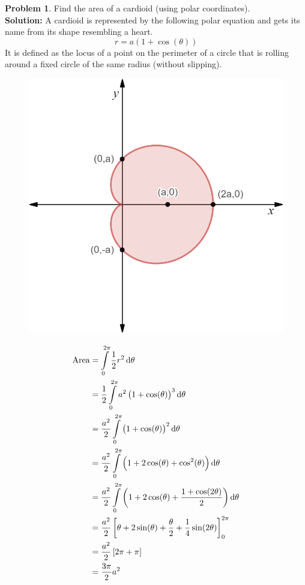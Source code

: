 \documentclass[14]{article}
\theoremstyle{definition}
\newtheorem{prob}{Problem}
\theoremstyle{case}
\begin{document}
\begin{prob}
Find the area of a cardioid (using polar coordinates).\\
\textbf{Solution:} A cardioid is represented by the following polar equation and gets its name from its shape resembling a heart. \[r = a\left(1 + \cos(\theta)\right)\]
It is defined as the locus of a point on the perimeter of a circle that is rolling around a fixed circle of the same radius (without slipping).
\begin{figure}[h]\centering
\includegraphics[scale=.3]{images/cardioid}
\end{figure}
\begin{align*}
\text{Area} &= \int\limits_0^{2\pi} \dfrac12 r^2 \dif \theta\\
&= \dfrac12 \int\limits_0^{2\pi} a^2\left(1+\cos(\theta)\right)^3 \dif \theta\\
&= \dfrac{a^2}2 \int\limits_0^{2\pi}\left(1 + \cos(\theta)\right)^2\dif \theta\\
&= \dfrac{a^2}{2} \int\limits_0^{2\pi} \left( 1 + 2\cos(\theta) + \cos^2(\theta) \right) \dif \theta\\
&= \dfrac{a^2}{2} \int\limits_0^{2\pi} \left( 1 + 2\cos(\theta) + \dfrac{1 + \cos(2\theta)}2 \right) \dif \theta\\
&= \dfrac{a^2}{2} \left[ \theta + 2\sin(\theta) + \dfrac{\theta}{2} + \dfrac14 \sin(2\theta) \right]_0^{2\pi}\\
&= \dfrac{a^2}{2} \left[ 2\pi + \pi \right]\\
&= \dfrac{3\pi}{2} a^2
\end{align*}
\end{prob}
\end{document}
